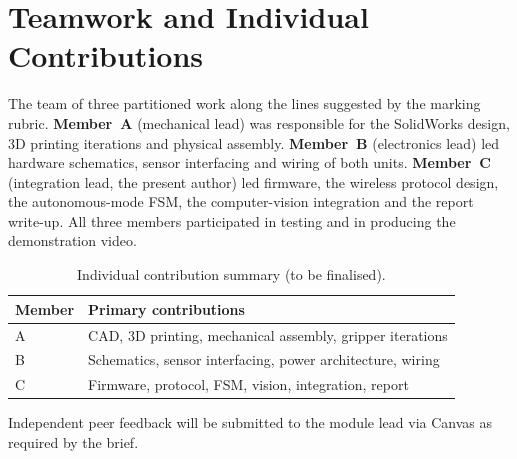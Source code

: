 \section{Teamwork and Individual Contributions}
\label{sec:teamwork}

The team of three partitioned work along the lines suggested by the
marking rubric. \textbf{Member~A} (mechanical lead) was responsible
for the SolidWorks design, 3D printing iterations and physical
assembly. \textbf{Member~B} (electronics lead) led hardware
schematics, sensor interfacing and wiring of both units.
\textbf{Member~C} (integration lead, the present author) led firmware,
the wireless protocol design, the autonomous-mode FSM, the
computer-vision integration and the report write-up. All three
members participated in testing and in producing the demonstration
video.

\begin{table}[t]
  \centering
  \caption{Individual contribution summary (to be finalised).}
  \footnotesize
  \begin{tabularx}{\columnwidth}{lX}
    \toprule
    \textbf{Member} & \textbf{Primary contributions} \\
    \midrule
    A & CAD, 3D printing, mechanical assembly, gripper iterations \\
    B & Schematics, sensor interfacing, power architecture, wiring \\
    C & Firmware, protocol, FSM, vision, integration, report \\
    \bottomrule
  \end{tabularx}
\end{table}

Independent peer feedback will be submitted to the module lead via
Canvas as required by the brief.
